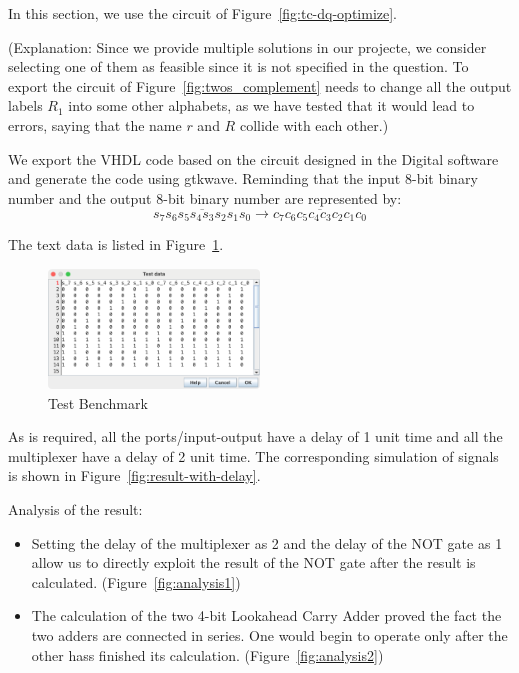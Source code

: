 \documentclass[conference]{IEEEtran}
\begin{document}
In this section, we use the circuit of Figure~\ref{fig:tc-dq-optimize}.

(Explanation: Since we provide multiple solutions in our projecte, we consider selecting one of them as feasible since it is not specified in the question. To export the circuit of Figure~\ref{fig:twos_complement} needs to change all
the output labels $R_1$ into some other alphabets, as we have tested that it would lead to errors, saying that the name $r$ and $R$ collide with each other.)

We export the VHDL code based on the circuit designed in the Digital software and generate the code using gtkwave.
Reminding that the input 8-bit binary number and the output 8-bit binary number are represented by:
\begin{equation}
    \overline{s_7s_6s_5s_4s_3s_2s_1s_0} \longrightarrow \overline{c_7c_6c_5c_4c_3c_2c_1c_0}
\end{equation}


The text data is listed in Figure~\ref{fig:test-benchmark}.

\begin{figure}[h!]
    \centering
    \includegraphics[width=0.5\textwidth]{assets/test-data.png}
    \caption{Test Benchmark}
    \label{fig:test-benchmark}
\end{figure}


As is required, all the ports/input-output have a delay of 1 unit time and all the multiplexer have a delay of 2 unit time.
The corresponding simulation of signals is shown in Figure~\ref{fig:result-with-delay}.


Analysis of the result:
\begin{itemize}
    \item Setting the delay of the multiplexer as 2 and the delay of the NOT gate as 1 allow us to directly exploit the result of the NOT gate after the result is calculated. (Figure~\ref{fig:analysis1})
    \item The calculation of the two 4-bit Lookahead Carry Adder proved the fact the two adders are connected in series. One would begin to operate only after the other hass finished its calculation. (Figure~\ref{fig:analysis2})
\end{itemize}
\end{document}
